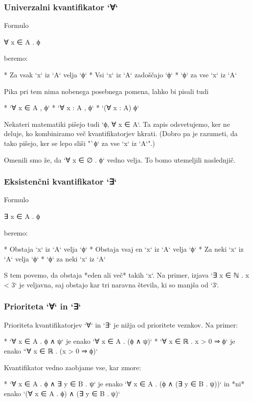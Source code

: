 \subsubsection{Univerzalni kvantifikator `∀`}

Formulo

    ∀ x ∈ A . ϕ

beremo:

* Za vsak `x` iz `A` velja `ϕ`
* Vsi `x` iz `A` zadoščajo `ϕ`
* `ϕ` za vse `x` iz `A`

Pika pri tem nima nobenega posebnega pomena, lahko bi pisali tudi

* `∀ x ∈ A , ϕ`
* `∀ x : A , ϕ`
* `(∀ x : A) ϕ`

Nekateri matematiki pišejo tudi `ϕ, ∀ x ∈ A`. Ta zapis odsvetujemo, ker ne deluje, ko kombiniramo več
kvantifikatorjev hkrati. (Dobro pa je razumeti, da tako pišejo, ker se lepo sliši "`ϕ` za vse `x` iz `A`".)

Omenili smo že, da `∀ x ∈ ∅ . ϕ` vedno velja. To bomo utemeljili naslednjič.

\subsubsection{Eksistenčni kvantifikator `∃`}

Formulo

    ∃ x ∈ A . ϕ

beremo:

* Obstaja `x` iz `A` velja `ϕ`
* Obstaja vsaj en `x` iz `A` velja `ϕ`
* Za neki `x` iz `A` velja `ϕ`
* `ϕ` za neki `x` iz `A`

S tem povemo, da obstaja *eden ali več* takih `x`. Na primer, izjava `∃ x ∈ ℕ . x
< 3` je veljavna, saj obstajo kar tri naravna števila, ki so manjša od `3`.


\subsubsection{Prioriteta `∀` in `∃`}

Prioriteta kvantifikatorjev `∀` in `∃` je nižja od prioritete veznkov. Na primer:

* `∀ x ∈ A . ϕ ∧ ψ` je enako `∀ x ∈ A . (ϕ ∧ ψ)`
* `∀ x ∈ ℝ . x > 0 ⇒ ϕ` je enako ``∀ x ∈ ℝ . (x > 0 ⇒ ϕ)`

Kvantifikator vedno zaobjame vse, kar zmore:

* `∀ x ∈ A . ϕ ∧ ∃ y ∈ B . ψ` je enako `∀ x ∈ A . (ϕ ∧ (∃ y ∈ B . ψ))` in *ni* enako `(∀ x ∈ A . ϕ) ∧ (∃ y ∈ B . ψ)`

